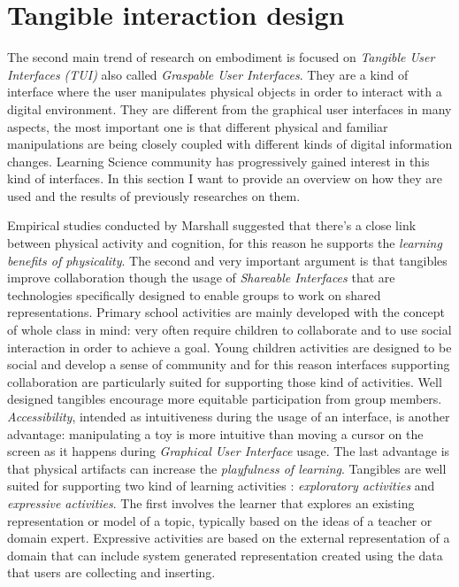 \section{Tangible interaction design}
The second main trend of research on embodiment is focused on \textit{Tangible User Interfaces (TUI)} also called \textit{Graspable User Interfaces}. They are a kind of interface where the user manipulates physical objects in order to interact with a digital environment. They are different from the graphical user interfaces in many aspects, the most important one is that different physical and familiar manipulations are being closely coupled with different kinds of digital information changes. Learning Science community has progressively gained interest in this kind of interfaces. In this section I want to provide an overview on how they are used and the results of previously researches on them.

Empirical studies conducted by Marshall \cite{marshall:tangible} suggested that there's a close link between physical activity and cognition, for this reason he supports the \textit{learning benefits of physicality}. The second and very important argument is that tangibles improve collaboration though the usage of \textit{Shareable Interfaces} that are technologies specifically designed to enable groups to work on shared representations. Primary school activities are mainly developed with the concept of whole class in mind: very often require children to collaborate and to use social interaction in order to achieve a goal. Young children activities are designed to be social and develop a sense of community and for this reason interfaces supporting collaboration are particularly suited for supporting those kind of activities. Well designed tangibles encourage more equitable participation from group members. \textit{Accessibility}, intended as intuitiveness during the usage of an interface, is another advantage: manipulating a toy is more intuitive than moving a cursor on the screen as it happens during \textit{Graphical User Interface} usage. The last advantage is that physical artifacts can increase the \textit{playfulness of learning}. Tangibles are well suited for supporting two kind of learning activities \cite{marshall:tangible}: \textit{exploratory activities} and \textit{expressive activities}. The first involves the learner that explores an existing representation or model of a topic, typically based on the ideas of a teacher or domain expert. Expressive activities are based on the external representation of a domain that can include system generated representation created using the data that users are collecting and inserting.

